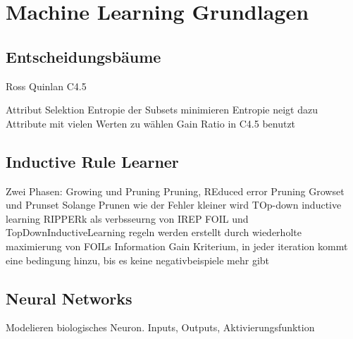 \chapter{Machine Learning Grundlagen}
\section{Entscheidungsbäume}
Ross Quinlan C4.5


Attribut Selektion
Entropie der Subsets minimieren \cite[S.~60ff]{Bramer2007}
Entropie neigt dazu Attribute mit vielen Werten zu wählen \cite[S.~72]{Bramer2007}
Gain Ratio in C4.5 benutzt


\section{Inductive Rule Learner}
Zwei Phasen: Growing und Pruning
Pruning, REduced error Pruning
Growset und Prunset
Solange Prunen wie der Fehler kleiner wird
TOp-down inductive learning
RIPPERk als verbsseurng von IREP
FOIL und TopDownInductiveLearning\cite[S.~701]{RusselNorvig}
regeln werden erstellt durch wiederholte maximierung von FOILs Information Gain Kriterium, in jeder iteration kommt eine bedingung hinzu, bis es keine negativbeispiele mehr gibt
\section{Neural Networks}
Modelieren biologisches Neuron.
Inputs, Outputs, Aktivierungsfunktion
